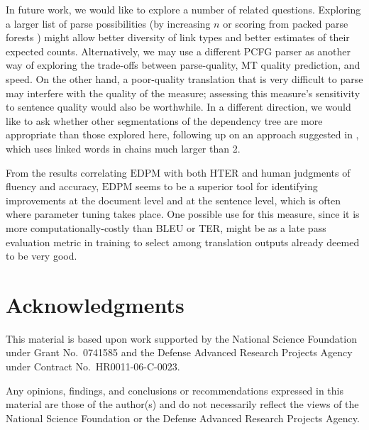 \documentclass[11pt]{article}
\newcommand{\blindthis}[1]{#1}
\newcommand{\myEDPM}[0]{\ensuremath{\mathrm{EDPM}}}
\begin{document}
In future work, we would like to explore a number of related
questions.  Exploring a larger list of parse possibilities (by
increasing $n$ or scoring from packed parse forests
\cite{huang08parseforests}) might allow better diversity of link types
and better estimates of their expected counts.  Alternatively, we may
use a different PCFG parser as another way of exploring the trade-offs
between parse-quality, MT quality prediction, and speed.  On the other
hand, a poor-quality translation that is very difficult to parse may
interfere with the quality of the measure; assessing this measure's
sensitivity to sentence quality would also be worthwhile. In a
different direction, we would like to ask whether other segmentations
of the dependency tree are more appropriate than those explored here,
following up on an approach suggested in
, which uses linked words in chains much
larger than 2.

From the results correlating \myEDPM{} with both HTER and human
judgments of fluency and accuracy, \myEDPM{} seems to be a superior
tool for identifying improvements at the document level and at the
sentence level, which is often where parameter tuning takes place. One
possible use for this measure, since it is more computationally-costly
than BLEU or TER, might be as a late pass evaluation metric in
training to select among translation outputs already deemed to be very
good.

\section*{Acknowledgments}

{\small
\blindthis{This material is based upon work supported by the National
  Science Foundation under Grant No.\ 0741585 and the Defense Advanced
  Research Projects Agency under Contract No.\ HR0011-06-C-0023.

  Any opinions, findings, and conclusions or recommendations expressed
  in this material are those of the author(s) and do not necessarily
  reflect the views of the National Science Foundation or the Defense
  Advanced Research Projects Agency.}
}




\end{document}
